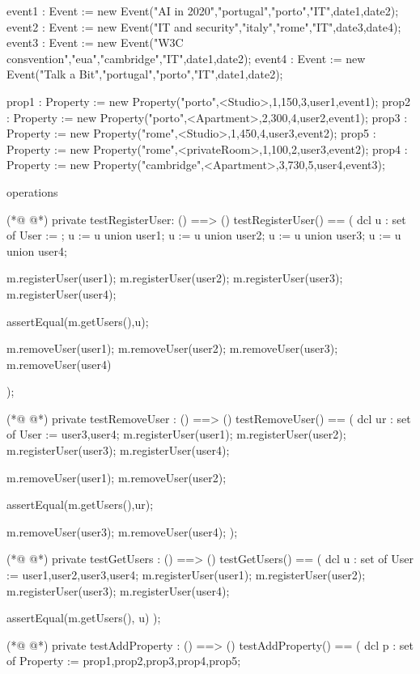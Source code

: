 \begin{vdmpp}[breaklines=true]
 event1 : Event := new Event("AI in 2020","portugal","porto","IT",date1,date2);
 event2 : Event := new Event("IT and security","italy","rome","IT",date3,date4);
 event3 : Event := new Event("W3C consvention","eua","cambridge","IT",date1,date2);
 event4 : Event := new Event("Talk a Bit","portugal","porto","IT",date1,date2);
 
 prop1 : Property := new Property("porto",<Studio>,1,150,3,user1,event1);
 prop2 : Property := new Property("porto",<Apartment>,2,300,4,user2,event1);
 prop3 : Property := new Property("rome",<Studio>,1,450,4,user3,event2);
 prop5 : Property := new Property("rome",<privateRoom>,1,100,2,user3,event2);
 prop4 : Property := new Property("cambridge",<Apartment>,3,730,5,user4,event3);

operations

(*@
\label{testRegisterUser:150}
@*)
 private testRegisterUser: () ==> ()
  testRegisterUser() ==
  (
   dcl u : set of User := {};
   u := u union {user1};
   u := u union {user2};
   u := u union {user3};
   u := u union {user4};
   
   m.registerUser(user1);
   m.registerUser(user2);
   m.registerUser(user3);
   m.registerUser(user4);
   
   assertEqual(m.getUsers(),u);
   
   m.removeUser(user1);
   m.removeUser(user2);
   m.removeUser(user3);
   m.removeUser(user4)
  
  );
 
(*@
\label{testRemoveUser:173}
@*)
 private testRemoveUser : () ==> ()
  testRemoveUser() ==
  (   
   dcl ur : set of User := {user3,user4};
   m.registerUser(user1);
   m.registerUser(user2);
   m.registerUser(user3);
   m.registerUser(user4);
   
   m.removeUser(user1);
   m.removeUser(user2);
   
   
   assertEqual(m.getUsers(),ur);
   
   m.removeUser(user3);
   m.removeUser(user4);
  );
 
(*@
\label{testGetUsers:192}
@*)
 private testGetUsers : () ==> ()
  testGetUsers() == 
  (
   dcl u : set of User := {user1,user2,user3,user4};
     m.registerUser(user1);
   m.registerUser(user2);
   m.registerUser(user3);
   m.registerUser(user4);
     
     assertEqual(m.getUsers(), u)
  );
 
(*@
\label{testAddProperty:204}
@*)
 private testAddProperty : () ==> ()
  testAddProperty() ==
  (
   dcl p : set of Property := {prop1,prop2,prop3,prop4,prop5};
   

\end{vdmpp}
